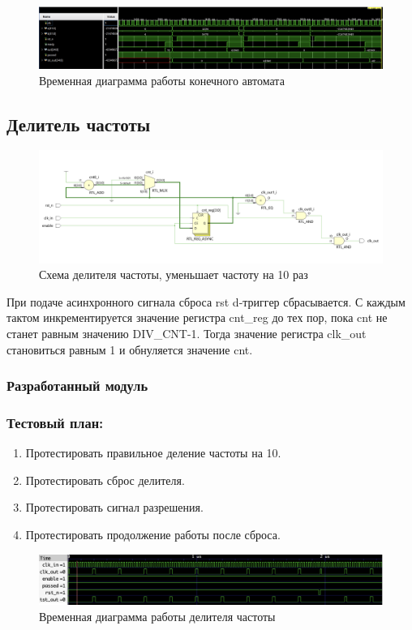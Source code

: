 \documentclass[12pt,onecolumn]{article}
\begin{document}
\begin{figure}[H]
  \centering
  \includegraphics[width=\textwidth]{image/fsm-diagram.png}
  \caption{Временная диаграмма работы конечного автомата}
\end{figure}

\subsection{Делитель частоты}
\begin{figure}[H]
  \centering
  \includegraphics[width=\textwidth]{image/freq-div.png}
  \caption{Схема делителя частоты, уменьшает частоту на 10 раз}
\end{figure}

При подаче асинхронного сигнала сброса rst d-триггер сбрасывается.
С каждым тактом инкрементируется значение регистра cnt\_reg до тех пор, пока cnt не станет равным значению DIV\_CNT-1. 
Тогда значение регистра clk\_out становиться равным 1 и обнуляется значение cnt.
\subsubsection{Разработанный модуль}

\subsubsection{Тестовый план:}
\begin{enumerate}
  \item Протестировать правильное деление частоты на 10.
  \item Протестировать сброс делителя.
  \item Протестировать сигнал разрешения.
  \item Протестировать продолжение работы после сброса.
\end{enumerate}

\begin{figure}[H]
  \centering
  \includegraphics[width=\textwidth]{image/freq-div-diagram.png}
  \caption{Временная диаграмма работы делителя частоты}
\end{figure}
\end{document}
